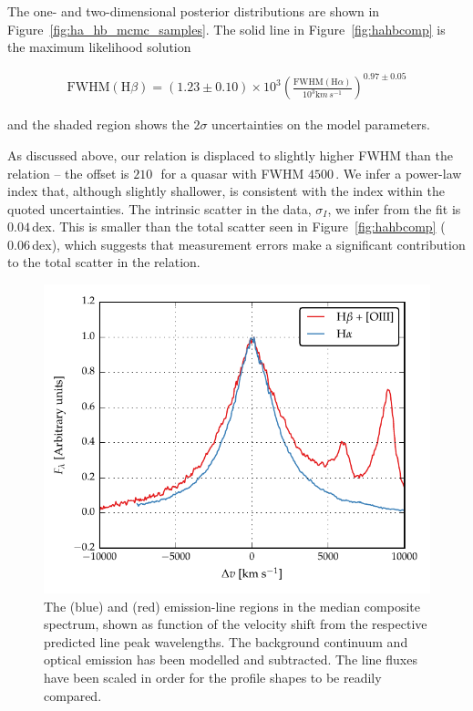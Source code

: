 The one- and two-dimensional posterior distributions are shown in Figure~\ref{fig:ha_hb_mcmc_samples}. 
The solid line in Figure~\ref{fig:hahbcomp} is the maximum likelihood solution

\begin{eqnarray}
  \label{eq:ha2hb}
  \mathrm{FWHM}(\mathrm{H}\beta) = \left( 1.23 \pm 0.10 \right) \times 10^3 \left( \frac{\mathrm{FWHM}(\mathrm{H}\alpha)}{10^3 {\mathrm km\,s^{-1}}} \right)^{0.97 \pm 0.05}
\end{eqnarray}

\noindent and the shaded region shows the $2\sigma$ uncertainties on the model parameters.

As discussed above, our relation is displaced to slightly higher \hb FWHM than the \citet{greene05b} relation -- the offset is $210$\,\kms\, for a quasar with \ha FWHM $4500$\,\kms.  
We infer a power-law index that, although slightly shallower, is consistent with the \citet{greene05b} index within the quoted uncertainties. 
The intrinsic scatter in the data, $\sigma_I$, we infer from  the fit is $0.04$\,dex. 
This is smaller than the total scatter seen in Figure~\ref{fig:hahbcomp} ($0.06$\,dex), which suggests that measurement errors make a significant contribution to the total scatter in the relation. 

\begin{figure}
    \centering 
    \includegraphics[width=0.8\linewidth]{figures/chapter03/ha_hb_composite.pdf} 
    \caption[{The \ha and \hb emission-line regions in the median composite spectrum, shown as function of the velocity shift from the respective predicted line peak wavelengths.}]{The \ha (blue) and \hb (red) emission-line regions in the median composite spectrum, shown as function of the velocity shift from the respective predicted line peak wavelengths. The background continuum and optical  emission has been modelled and subtracted. The line fluxes have been scaled in order for the profile shapes to be readily compared.}
    \label{fig:balmer_composite}
\end{figure}

